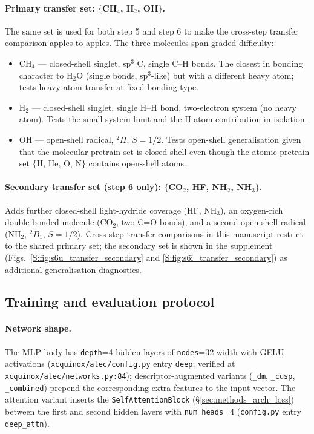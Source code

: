 \documentclass[11pt,letterpaper]{article}
\begin{document}
\paragraph{Primary transfer set: $\{$CH$_4$, H$_2$, OH$\}$.} The same set is
used for both step 5 and step 6 to make the cross-step transfer comparison
apples-to-apples. The three molecules span graded difficulty:
\begin{itemize}
\item CH$_4$ --- closed-shell singlet, sp$^3$ C, single C--H bonds. The
  closest in bonding character to H$_2$O (single bonds, sp$^3$-like) but
  with a different heavy atom; tests heavy-atom transfer at fixed bonding
  type.
\item H$_2$ --- closed-shell singlet, single H--H bond, two-electron system
  (no heavy atom). Tests the small-system limit and the
  H-atom contribution in isolation.
\item OH --- open-shell radical, $^2\Pi$, $S{=}1/2$. Tests open-shell
  generalisation given that the molecular pretrain set is closed-shell
  even though the atomic pretrain set $\{$H, He, O, N$\}$ contains
  open-shell atoms.
\end{itemize}

\paragraph{Secondary transfer set (step 6 only): $\{$CO$_2$, HF, NH$_2$, NH$_3\}$.}
Adds further closed-shell light-hydride coverage (HF, NH$_3$), an
oxygen-rich double-bonded molecule (CO$_2$, two C=O bonds), and a second
open-shell radical (NH$_2$, $^2B_1$, $S{=}1/2$). Cross-step transfer
comparisons in this manuscript restrict to the shared primary set; the
secondary set is shown in the supplement (Figs.~\ref{S:fig:s6u_transfer_secondary}
and \ref{S:fig:s6i_transfer_secondary}) as additional generalisation
diagnostics.

\subsection{Training and evaluation protocol}
\label{sec:methods_training_eval}

\paragraph{Network shape.} The MLP body has \texttt{depth}=4 hidden layers
of \texttt{nodes}=32 width with GELU activations
(\texttt{xcquinox/alec/config.py} entry \texttt{deep}; verified at
\texttt{xcquinox/alec/networks.py:84}); descriptor-augmented variants
(\texttt{\_dm}, \texttt{\_cusp}, \texttt{\_combined}) prepend the
corresponding extra features to the input vector. The attention variant
inserts the \texttt{SelfAttentionBlock} (\S\ref{sec:methods_arch_loss})
between the first and second hidden layers with \texttt{num\_heads}=4
(\texttt{config.py} entry \texttt{deep\_attn}).
\end{document}
